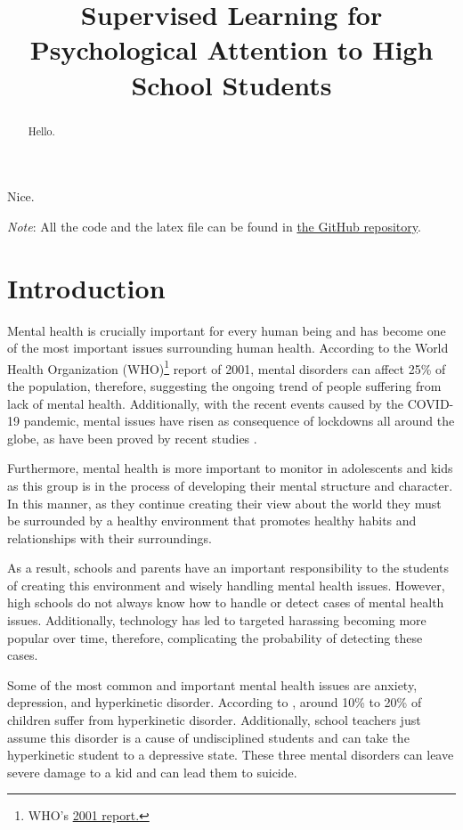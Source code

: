\documentclass[conference]{IEEEtran}
\title{Supervised Learning for Psychological Attention to High School Students}
\author{\IEEEauthorblockN{Juan Sebastián Cárdenas-Rodríguez}
  \IEEEauthorblockA{\textit{Department of Mathematical Sciences} \\
    \textit{EAFIT University}\\
    Medellín, Colombia \\
    jscardenar@eafit.edu.co} \and \IEEEauthorblockN{David Plazas}
  \IEEEauthorblockA{\textit{Department of Mathematical Sciences} \\
    \textit{EAFIT University}\\
    Medellín, Colombia \\
    dplazas@eafit.edu.co} }
\theoremstyle{definition}
\theoremstyle{remark}
\theoremstyle{remark}
\begin{document}
\maketitle

\begin{abstract}
  Hello.
\end{abstract}

\begin{IEEEkeywords}
  Nice.
\end{IEEEkeywords}

\textit{Note}: All the code and the latex file can be found in
\href{https://github.com/juanscr/ai-works}{the GitHub repository}.

\section{Introduction}

Mental health is crucially important for every human being and has become one of
the most important issues surrounding human health. According to the World
Health Organization (WHO)\footnote{WHO's \href{https://bit.ly/34l2v94}{2001
    report.}} report of 2001, mental disorders can affect 25\% of the
population, therefore, suggesting the ongoing trend of people suffering from
lack of mental health. Additionally, with the recent events caused by the
COVID-19 pandemic, mental issues have risen as consequence of lockdowns all
around the globe, as have been proved by recent studies
\parencite{rossi2020,xiong2020}.

Furthermore, mental health is more important to monitor in adolescents and kids
as this group is in the process of developing their mental structure and
character. In this manner, as they continue creating their view about the world
they must be surrounded by a healthy environment that promotes healthy habits
and relationships with their surroundings.

As a result, schools and parents have an important responsibility to the
students of creating this environment and wisely handling mental health issues.
However, high schools do not always know how to handle or detect cases of mental
health issues. Additionally, technology has led to targeted harassing becoming
more popular over time, therefore, complicating the probability of detecting
these cases.

Some of the most common and important mental health issues are anxiety,
depression, and hyperkinetic disorder. According to \textcite{schulte2016},
around 10\% to 20\% of children suffer from hyperkinetic disorder. Additionally,
school teachers just assume this disorder is a cause of undisciplined students
and can take the hyperkinetic student to a depressive state. These three mental
disorders can leave severe damage to a kid and can lead them to suicide.
\end{document}
